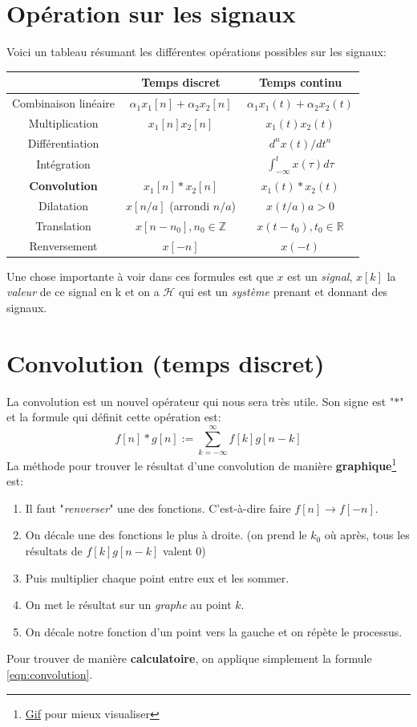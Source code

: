 \documentclass{report}
\begin{document}
\section{Opération sur les signaux}
Voici un tableau résumant les différentes opérations possibles sur les signaux:
\begin{center}
\begin{tabular}{|c|c|c|}
	\hline
	 & Temps discret & Temps continu\\
	\hline
	Combinaison linéaire & $\alpha_1 x_1[n] + \alpha_2 x_2[n]$ & $\alpha_1 x_1(t) + \alpha_2 x_2(t)$\\
	\hline
	Multiplication & $x_1[n]x_2[n]$ & $x_1(t)x_2(t)$\\
	\hline
	Différentiation &  & $d^nx(t)/dt^n$\\
	\hline
	Intégration &  & $\int_{-\infty}^t x(\tau)d\tau$\\
	\hline
	\textbf{Convolution} & $x_1[n] \ast x_2[n]$ & $x_1(t) \ast x_2(t)$\\
	\hline
	Dilatation & $x[n/a]$ (arrondi $n/a$) & $x(t/a) a>0$\\
	\hline
	Translation & $x[n-n_0], n_0 \in \mathbb{Z}$ & $x(t-t_0), t_0 \in \mathbb{R}$\\
	\hline
	Renversement & $x[-n]$ & $x(-t)$\\
	\hline
\end{tabular}
\end{center}
Une chose importante à voir dans ces formules est que $x$ est un \textit{signal}, $x[k]$ la \textit{valeur} de ce signal en k et on a $\mathcal{H}$ qui est un \textit{système} prenant et donnant des signaux.

\section{Convolution (temps discret)} \label{convo}
La convolution est un nouvel opérateur qui nous sera très utile. Son signe est "$\ast$" et la formule qui définit cette opération est:
\begin{equation} \label{eqn:convolution}
f[n] \ast g[n] := \sum_{k=-\infty}^{\infty} f[k]g[n-k] 
\end{equation}
La méthode pour trouver le résultat d'une convolution de manière \textbf{graphique}\footnote{\href{https://upload.wikimedia.org/wikipedia/commons/c/c6/Convolucion_Funcion_Pi.gif}{Gif} pour mieux visualiser} est:
\begin{enumerate}
\item Il faut "\textit{renverser}" une des fonctions. C'est-à-dire faire $f[n] \rightarrow f[-n]$.
\item On décale une des fonctions le plus à droite. (on prend le $k_0$ où après, tous les résultats de $f[k]g[n-k]$ valent $0$) 
\item Puis multiplier chaque point entre eux et les sommer.
\item On met le résultat sur un \textit{graphe} au point $k$.
\item On décale notre fonction d'un point vers la gauche et on répète le processus.
\end{enumerate}
Pour trouver de manière \textbf{calculatoire}, on applique simplement la formule \ref{eqn:convolution}.
\end{document}
